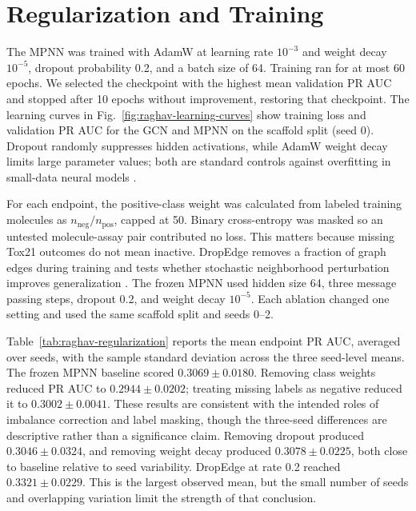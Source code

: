 \section{Regularization and Training}
\label{sec:regularization}

The MPNN was trained with AdamW at learning rate $10^{-3}$ and weight decay
$10^{-5}$, dropout probability 0.2, and a batch size of 64. Training ran for at
most 60 epochs. We selected the checkpoint with the highest mean validation PR
AUC and stopped after 10 epochs without improvement, restoring that checkpoint.
The learning curves in Fig.~\ref{fig:raghav-learning-curves} show training loss
and validation PR AUC for the GCN and MPNN on the scaffold split (seed 0).
Dropout randomly suppresses hidden activations, while AdamW weight decay limits
large parameter values; both are standard controls against overfitting in
small-data neural models \cite{srivastava2014dropout,loshchilov2019decoupled}.

For each endpoint, the positive-class weight was calculated from labeled
training molecules as $n_{\mathrm{neg}}/n_{\mathrm{pos}}$, capped at 50.
Binary cross-entropy was masked so an untested molecule-assay pair contributed
no loss. This matters because missing Tox21 outcomes do not mean inactive.
DropEdge removes a fraction of graph edges during training and tests whether
stochastic neighborhood perturbation improves generalization
\cite{rong2020dropedge}. The frozen MPNN used hidden size 64, three message
passing steps, dropout 0.2, and weight decay $10^{-5}$. Each ablation changed
one setting and used the same scaffold split and seeds 0--2.

Table~\ref{tab:raghav-regularization} reports the mean endpoint PR AUC, averaged
over seeds, with the sample standard deviation across the three seed-level
means. The frozen MPNN baseline scored $0.3069 \pm 0.0180$. Removing class
weights reduced PR AUC to $0.2944 \pm 0.0202$; treating missing labels as
negative reduced it to $0.3002 \pm 0.0041$. These results are consistent with
the intended roles of imbalance correction and label masking, though the
three-seed differences are descriptive rather than a significance claim.
Removing dropout produced $0.3046 \pm 0.0324$, and removing weight decay
produced $0.3078 \pm 0.0225$, both close to baseline relative to seed
variability. DropEdge at rate 0.2 reached $0.3321 \pm 0.0229$. This is the
largest observed mean, but the small number of seeds and overlapping variation
limit the strength of that conclusion.


